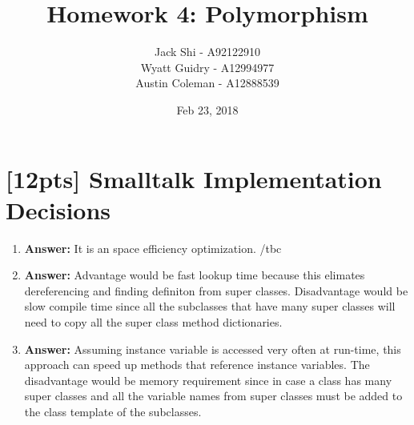 \documentclass{article}
\title{Homework 4: Polymorphism}
\date{Feb 23, 2018}
\author{Jack Shi - A92122910 \\
				Wyatt Guidry - A12994977 \\
				Austin Coleman - A12888539}
\begin{document}
\maketitle
\section{[12pts] Smalltalk Implementation Decisions}
\begin{enumerate}
	\item \textbf{Answer: }It is an space efficiency optimization. /tbc
	\item \textbf{Answer: }Advantage would be fast lookup time because this elimates
			dereferencing and finding definiton from super classes. Disadvantage would
			be slow compile time since all the subclasses that have many super classes
			will need to copy all the super class method dictionaries.
	\item \textbf{Answer: }Assuming instance variable is accessed very often at
		run-time, this approach can speed up methods that reference instance
		variables. The disadvantage would be memory requirement since in case a
		class has many super classes and all the variable names from super classes
		must be added to the class template of the subclasses.

\end{enumerate}

\end{document}

